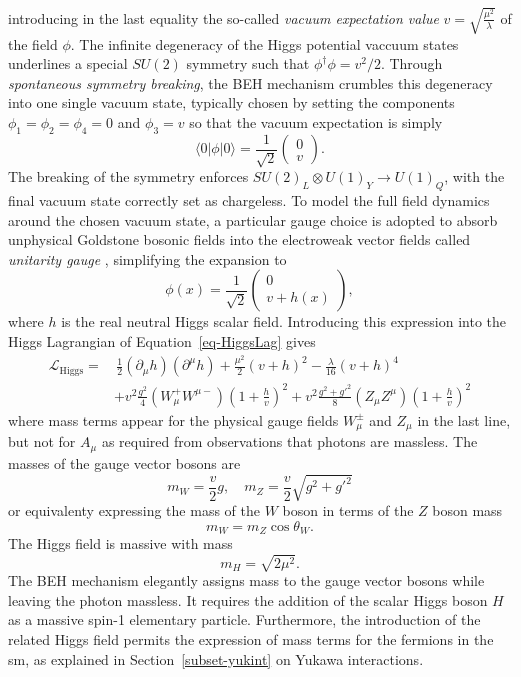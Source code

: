 introducing in the last equality the so-called \textit{vacuum expectation value} $v = \sqrt{\frac{\mu^2}{\lambda}}$ of the field $\phi$. The infinite degeneracy of the Higgs potential vaccuum states underlines a special $SU(2)$ symmetry such that $\phi^{\dagger} \phi = v^2/2$. Through \textit{spontaneous symmetry breaking}, the BEH mechanism crumbles this degeneracy into one single vacuum state, typically chosen by setting the components $\phi_1 = \phi_2 = \phi_4 = 0$ and $\phi_3 = v$ so that the vacuum expectation is simply
\begin{equation}
\langle 0|\phi|0 \rangle = \frac{1}{\sqrt{2}} \begin{pmatrix}
        0\\ 
        v
    \end{pmatrix}.
\end{equation}
The breaking of the symmetry enforces $SU(2)_L \otimes U(1)_Y \rightarrow U(1)_Q$, with the final vacuum state correctly set as chargeless. To model the full field dynamics around the chosen vacuum state, a particular gauge choice is adopted to absorb unphysical Goldstone bosonic fields into the electroweak vector fields called \textit{unitarity gauge} \cite{PhysRevD.7.1068}, simplifying the expansion to
\begin{equation}
    \phi(x) = \frac{1}{\sqrt{2}} \begin{pmatrix}
            0\\ 
            v + h(x)
        \end{pmatrix},
\end{equation}
where $h$ is the real neutral Higgs scalar field. Introducing this expression into the Higgs Lagrangian of Equation~\ref{eq-HiggsLag} gives
\begin{equation}\label{eq-fullHiggs}
    \begin{split}
        \mathcal{L}_{\text{Higgs}} = & \,\frac{1}{2} (\partial_\mu h)(\partial^\mu h) + \frac{\mu^2}{2}(v+h)^2  - \frac{\lambda}{16}(v+h)^4 \\
        &+ v^2 \frac{g^2}{4} (W_{\mu}^+W^{\mu-})(1+\frac{h}{v})^2 + v^2 \frac{g^2 + {g'}^2}{8}(Z_{\mu}Z^{\mu})(1+\frac{h}{v})^2 
    \end{split}
\end{equation}
where mass terms appear for the physical gauge fields $W_{\mu}^{\pm}$ and $Z_\mu$ in the last line, but not for $A_{\mu}$ as required from observations that photons are massless. The masses of the gauge vector bosons are
\begin{equation}
    m_W = \frac{v}{2} g , \quad m_Z = \frac{v}{2}\sqrt{g^2 +g'^2} 
\end{equation}
or equivalenty expressing the mass of the $W$ boson in terms of the $Z$ boson mass \[m_W = m_Z \cos\theta_W.\] The Higgs field is massive with mass \[m_H = \sqrt{2\mu^2}.\] The BEH mechanism elegantly assigns mass to the gauge vector bosons while leaving the photon massless. It requires the addition of the scalar Higgs boson $H$ as a massive spin-1 elementary particle. Furthermore, the introduction of the related Higgs field permits the expression of mass terms for the fermions in the \gls{sm}, as explained in Section~\ref{subset-yukint} on Yukawa interactions. 

